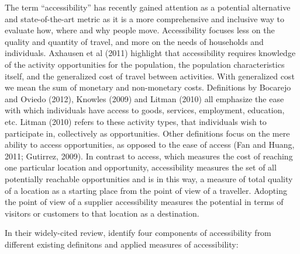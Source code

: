 

The term “accessibility” has recently gained attention as a potential alternative and state-of-the-art metric as it is a more comprehensive and inclusive way to evaluate how, where and why people move. Accessibility focuses less on the quality and quantity of travel, and more on the needs of households and individuals. Axhausen et al (2011) highlight that accessibility requires knowledge of the activity opportunities for the population, the population characteristics itself, and the generalized cost of travel between activities. With generalized cost we mean the sum of monetary and non-monetary costs. Definitions by Bocarejo and Oviedo (2012), Knowles (2009) and Litman (2010) all emphasize the ease with which individuals have access to goods, services, employment, education, etc. Litman (2010) refers to these activity types, that individuals wish to participate in, collectively as opportunities. Other definitions focus on the mere ability to access opportunities, as opposed to the ease of access (Fan and Huang, 2011; Gutirrez, 2009). In contrast to access, which measures the cost of reaching one particular location and opportunity, accessibility measures the set of all potentially reachable opportunities and is in this way, a measure of total quality of a location as a starting place from the point of view of a traveller. Adopting the point of view of a supplier accessibility measures the potential in terms of visitors or customers to that location as a destination.


In their widely-cited review, \citet{Geurs2004AccessibilityReview} identify four components of accessibility 
from different existing definitons and applied measures of accessibility:


